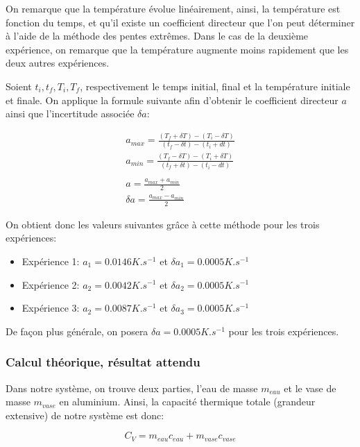 \documentclass[12pt]{article}
\begin{document}
On remarque que la température évolue linéairement, ainsi, la température est fonction du temps, et qu'il existe un coefficient directeur que l'on peut déterminer à l'aide de la méthode des pentes extrêmes.
Dans le cas de la deuxième expérience, on remarque que la température augmente moins rapidement que les deux autres expériences. 

Soient $t_i, t_f, T_i, T_f$, respectivement le temps initial, final et la température initiale et finale. On applique la formule suivante afin d'obtenir le coefficient directeur $a$ ainsi que l'incertitude associée $\delta a$:

\begin{gather*}
	a_{max} = \frac{(T_f + \delta T) - (T_i - \delta T)}{(t_f - \delta t) - (t_i + dt)} \\
	a_{min} = \frac{(T_f - \delta T) - (T_i + \delta T)}{(t_f + \delta t) - (t_i - dt)} \\
	\\
	a = \frac{a_{max} + a_{min}}{2} \\
	\delta a = \frac{a_{max} - a_{min}}{2}
\end{gather*}

On obtient donc les valeurs suivantes grâce à cette méthode pour les trois expériences:
\begin{itemize}
	\item Expérience 1: $a_1 = 0.0146 K.s^{-1}$ et $\delta a_1 = 0.0005 K.s^{-1}$
	\item Expérience 2: $a_2 = 0.0042 K.s^{-1}$ et $\delta a_2 = 0.0005 K.s^{-1}$
	\item Expérience 3: $a_2 = 0.0087 K.s^{-1}$ et $\delta a_3 = 0.0005 K.s^{-1}$
\end{itemize}

De façon plus générale, on posera $\delta a = 0.0005 K.s^{-1}$ pour les trois expériences.

\newpage
\subsubsection{Calcul théorique, résultat attendu}

Dans notre système, on trouve deux parties, l'eau de masse $m_{eau}$ et le vase de masse $m_{vase}$ en aluminium. Ainsi, la capacité thermique totale (grandeur extensive) de notre système est donc:

\begin{equation}
	C_V = m_{eau}c_{eau}+ m_{vase} c_{vase}
\end{equation}
\end{document}
